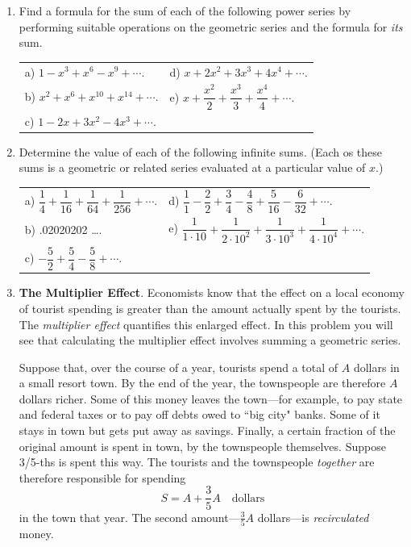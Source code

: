 \begin{enumerate}
\item Find a formula for the sum of each of the following power series
by performing suitable operations on the geometric series and the
formula for {\em its\/} sum.


\begin{tabular}{ll}
a) $1-x^3 + x^6 - x^9 + \cdots .$ & d) $x+2x^2 +3x^3 + 4x^4 + \cdots .$ \\[3pt]
b) $x^2 + x^6 + x^{10} + x^{14} + \cdots .$ & e) $x +
  \dfrac{x^2}{2} + \dfrac{x^3}{3} + \dfrac{x^4}{4} + \cdots .$ \\ [7pt]
c) $1-2x+3x^2-4x^3 + \cdots .$ &
\end{tabular}



\item Determine the value of each of the following infinite sums.
(Each os these sums is a geometric or related series evaluated at a
particular value of $x$.)




\begin{tabular}{ll}
  a) $\dfrac{1}{4} + \dfrac{1}{16} + \dfrac{1}{64} + \dfrac{1}{256} + \cdots
  .$ & d) $\dfrac{1}{1} - \dfrac{2}{2} + \dfrac{3}{4} - \dfrac{4}{8} + \dfrac{5}{16} - \dfrac{6}{32} + \cdots .$ \\ [7pt]
b) .02020202 \ldots . & e)
  $\dfrac{1}{1\cdot 10} + \dfrac{1}{2\cdot10^2} + \dfrac{1}{3\cdot10^3} +
  \dfrac{1}{4\cdot10^4} + \cdots .$
\\ [7pt]
c) $- \dfrac{5}{2} + \dfrac{5}{4} - \dfrac{5}{8} + \cdots .$ & 
\end{tabular}



\item {\bf The Multiplier Effect}.  Economists know that the effect on
a local economy of tourist spending is greater than the amount
actually spent by the tourists.  The {\em multiplier effect}
quantifies this enlarged effect.  In this problem you will see that
calculating the multiplier effect involves summing a geometric series.

Suppose that, over the course of a year, tourists spend a total of $A$
dollars in a small resort town.  By the end of the year, the
townspeople are therefore $A$ dollars richer.  Some of this money
leaves the town---for example, to pay state and federal taxes or to
pay off debts owed to ``big city" banks.  Some of it stays in town but
gets put away as savings.  Finally, a certain fraction of the original
amount is spent in town, by the townspeople themselves.  Suppose
3/5-ths is spent this way.  The tourists and the townspeople {\em
  together} are therefore responsible for spending
\[
S = A + \dfrac{3}{5} A \quad \mbox{dollars}
\]
in the town that year.  The second amount---$\tfrac{3}{5}A$
dollars---is {\em recirculated} money.


\end{enumerate}
